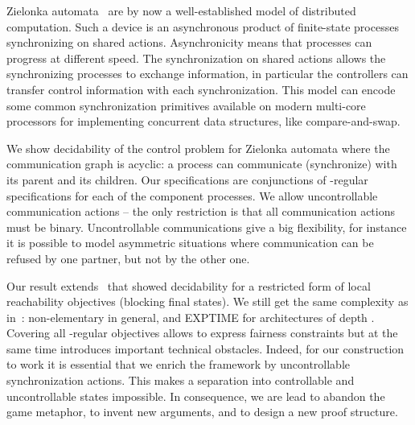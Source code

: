 \documentclass[10pt,a4paper]{article}
\begin{document}
Zielonka automata~\cite{zie87,ms97} are by now a well-established
model of distributed computation. Such a device is an asynchronous
product of finite-state processes synchronizing on shared
actions. Asynchronicity means that processes can progress at different
speed. The synchronization on shared actions allows the synchronizing
processes to exchange information, in particular the controllers can
transfer control information with each synchronization. This model can
encode some common synchronization primitives available on modern
multi-core processors for implementing concurrent data structures, like compare-and-swap.

We show decidability of the control problem for Zielonka automata
where the communication graph is acyclic: a process can communicate
(synchronize) with its parent and its children. Our specifications are
conjunctions of -regular specifications for each of the component
processes. We allow uncontrollable communication actions -- the only
restriction is that all communication actions must be
binary. Uncontrollable communications give a big flexibility, for
instance it is possible to model asymmetric situations where
communication can be refused by one partner, but not by the other one.

Our result extends~\cite{GGMW13} that  showed decidability for a
restricted form of local reachability objectives (blocking final
states). We still get the same complexity as in~\cite{GGMW13}:
non-elementary in general, and EXPTIME for architectures of depth .
Covering all -regular objectives allows to express fairness
constraints but at the same time introduces important technical
obstacles. Indeed, for our construction to work it is essential that
we enrich the framework by uncontrollable synchronization actions. This makes a separation into
controllable and uncontrollable states impossible. In consequence, we are lead to abandon the game metaphor, to
invent new arguments, and to design a new proof structure.
\end{document}
